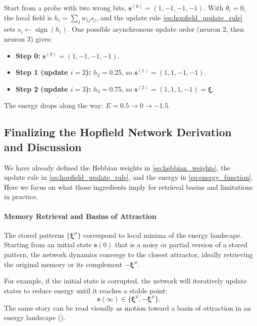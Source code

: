 \begin{tcolorbox}[summarybox, title={Numeric recall trace (two asynchronous flips)}]
Start from a probe with two wrong bits, \(\mathbf{s}^{(0)}=(1,-1,-1,-1)\). With \(\theta_i=0\), the local field is \(h_i=\sum_j w_{ij}s_j\), and the update rule \eqref{eq:hopfield_update_rule} sets \(s_i\leftarrow \operatorname{sign}(h_i)\). One possible asynchronous update order (neuron 2, then neuron 3) gives:
\begin{itemize}
    \item \textbf{Step 0:} \(\mathbf{s}^{(0)}=(1,-1,-1,-1)\).
    \item \textbf{Step 1 (update \(i=2\)):} \(h_2=0.25\), so \(\mathbf{s}^{(1)}=(1,1,-1,-1)\).
    \item \textbf{Step 2 (update \(i=3\)):} \(h_3=0.75\), so \(\mathbf{s}^{(2)}=(1,1,1,-1)=\mathbf{\xi}\).
\end{itemize}
The energy drops along the way: \(E=0.5 \rightarrow 0 \rightarrow -1.5\).
\end{tcolorbox}

\subsection{Finalizing the Hopfield Network Derivation and Discussion}
\label{sec:hopfield_finalizing_the_hopfield_network_derivation_and_discussion}

We have already defined the Hebbian weights in \eqref{eq:hebbian_weights}, the update rule in \eqref{eq:hopfield_update_rule}, and the energy in \eqref{eq:energy_function}. Here we focus on what those ingredients imply for retrieval basins and limitations in practice.

\paragraph{Memory Retrieval and Basins of Attraction}

The stored patterns \(\{\mathbf{\xi}^\mu\}\) correspond to local minima of the energy landscape. Starting from an initial state \(\mathbf{s}(0)\) that is a noisy or partial version of a stored pattern, the network dynamics converge to the closest attractor, ideally retrieving the original memory or its complement \(-\mathbf{\xi}^\mu\).

For example, if the initial state is corrupted, the network will iteratively update states to reduce energy until it reaches a stable point:
\[
\mathbf{s}(\infty) \in \{\mathbf{\xi}^\mu, -\mathbf{\xi}^\mu\}.
\]
The same story can be read visually as motion toward a basin of attraction in an energy landscape ().

